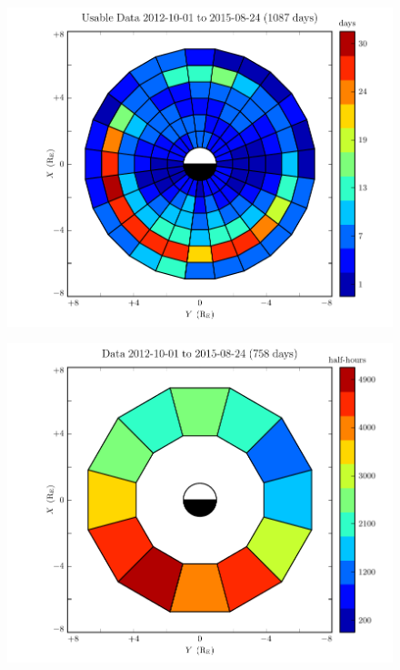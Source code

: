 \begin{figure}[!htb]
    \centering
    \includegraphics[width=\textwidth]{figures/pos_all_sharp.pdf}
    \caption[Distribution of Usable Van Allen Probe Data: Fine Resolution]{
      \todo{$\cdots$}
    }
    \label{fig_pos_all_sharp}
\end{figure}

\begin{figure}[!htb]
    \centering
    \includegraphics[width=\textwidth]{figures/pos_all.pdf}
    \caption[Distribution of Usable Van Allen Probe Data]{
      \todo{$\cdots$}
    }
    \label{fig_pos_all}
\end{figure}


